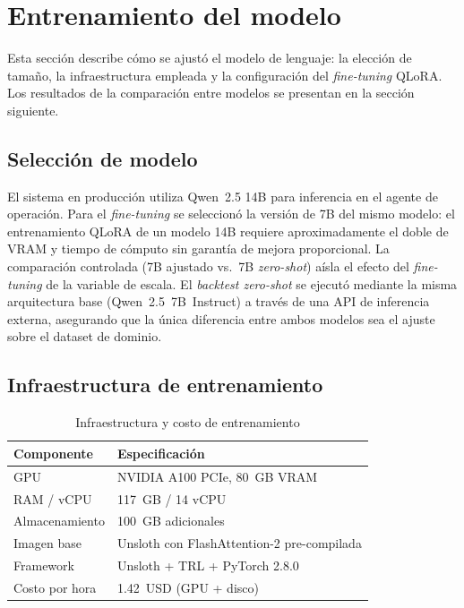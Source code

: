 \documentclass[10pt,twocolumn]{article}
\begin{document}
\section{Entrenamiento del modelo}

Esta secci\'on describe c\'omo se ajust\'o el modelo de lenguaje: la elecci\'on de tama\~no, la infraestructura empleada y la configuraci\'on del \textit{fine-tuning} QLoRA. Los resultados de la comparaci\'on entre modelos se presentan en la secci\'on siguiente.

\subsection{Selecci\'on de modelo}

El sistema en producci\'on utiliza Qwen~2.5 14B para inferencia en el agente de operaci\'on. Para el \textit{fine-tuning} se seleccion\'o la versi\'on de 7B del mismo modelo: el entrenamiento QLoRA de un modelo 14B requiere aproximadamente el doble de VRAM y tiempo de c\'omputo sin garant\'ia de mejora proporcional. La comparaci\'on controlada (7B ajustado vs.\ 7B \textit{zero-shot}) a\'isla el efecto del \textit{fine-tuning} de la variable de escala. El \textit{backtest zero-shot} se ejecut\'o mediante la misma arquitectura base (Qwen~2.5~7B~Instruct) a trav\'es de una API de inferencia externa, asegurando que la \'unica diferencia entre ambos modelos sea el ajuste sobre el dataset de dominio.

\subsection{Infraestructura de entrenamiento}
\label{sec:infra}

\begin{table}[H]
\centering
\caption{Infraestructura y costo de entrenamiento}
\label{tab:infra}
\footnotesize
\begin{tabularx}{\columnwidth}{lX}
\toprule
\textbf{Componente} & \textbf{Especificaci\'on} \\
\midrule
GPU & NVIDIA A100 PCIe, 80~GB VRAM \\
RAM / vCPU & 117~GB / 14 vCPU \\
Almacenamiento & 100~GB adicionales \\
Imagen base & Unsloth con FlashAttention-2 pre-compilada \\
Framework & Unsloth + TRL + PyTorch 2.8.0 \\
Costo por hora & 1.42~USD (GPU + disco) \\
\bottomrule
\end{tabularx}
\end{table}
\end{document}
